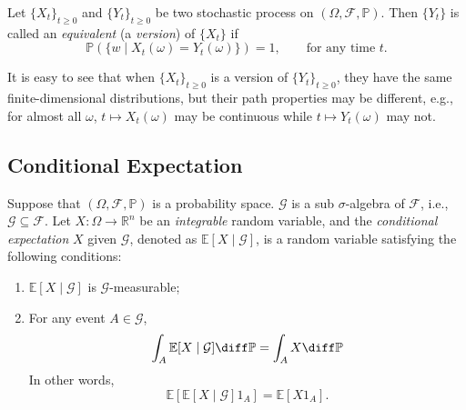 \begin{definition}
Let $\{X_t\}_{t\ge0}$ and $\{Y_t\}_{t\ge0}$ be two stochastic process on $(\Omega,\mathcal{F},\mathbb{P})$.
Then $\{Y_t\}$ is called an \emph{equivalent} (a \emph{version}) of 
$\{X_t\}$ if 
\[
\mathbb{P}(\{w\mid X_t(\omega)=Y_t(\omega)\})=1,\qquad
\text{for any time $t$}.
\]
\end{definition}
\begin{remark}
It is easy to see that when $\{X_t\}_{t\ge0}$ is a version of $\{Y_t\}_{t\ge0}$, they have the same finite-dimensional distributions, but their path properties may be different, e.g., for almost all $\omega$, 
$t\mapsto X_t(\omega)$ may be continuous while 
$t\mapsto Y_t(\omega)$ may not.
\end{remark}

\subsection{Conditional Expectation}
\begin{definition}\label{Def:2:4}
Suppose that $(\Omega,\mathcal{F},\mathbb{P})$ is a probability space.
$\mathcal{G}$ is a sub $\sigma$-algebra of $\mathcal{F}$, i.e., $\mathcal{G}\subseteq\mathcal{F}$.
Let $X:\Omega\to\mathbb{R}^n$ be an \textit{integrable} random variable, and the \emph{conditional expectation} $X$ given $\mathcal{G}$, denoted as 
$\mathbb{E}[X\mid\mathcal{G}]$, is a random variable 
satisfying the following conditions:
\begin{enumerate}
\item
$\mathbb{E}[X\mid\mathcal{G}]$ is $\mathcal{G}$-measurable;
\item
For any event $A\in\mathcal{G}$,
\[
\int_A\mathbb{E}[X\mid\mathcal{G}]\diff\mathbb{P}
=
\int_AX\diff\mathbb{P}
\]
In other words,
\[
\mathbb{E}[\mathbb{E}[X\mid\mathcal{G}]1_A]=\mathbb{E}[X1_A].
\]
\end{enumerate}
\end{definition}


